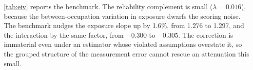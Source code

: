 \cref{tab:eiv} reports the benchmark. The reliability complement is small ($\lambda = 0.016$), because the between-occupation variation in exposure dwarfs the scoring noise. The benchmark nudges the exposure slope up by 1.6\%, from 1.276 to 1.297, and the interaction by the same factor, from $-0.300$ to $-0.305$. The correction is immaterial even under an estimator whose violated assumptions overstate it, so the grouped structure of the measurement error cannot rescue an attenuation this small.



